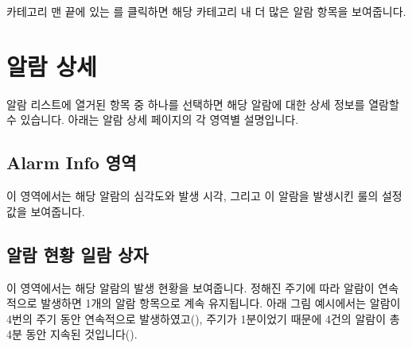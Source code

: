 \documentclass[letterpaper,10pt,english]{sphinxmanual}
\begin{document}
카테고리 맨 끝에 있는 를 클릭하면 해당 카테고리 내 더 많은 알람 항목을 보여줍니다.
\begin{quote}

\begin{figure}[H]
\centering

\noindent{}
\end{figure}
\end{quote}


\section{알람 상세}
\label{\detokenize{part05/index:alarm-details}}\label{\detokenize{part05/index:id3}}
알람 리스트에 열거된 항목 중 하나를 선택하면 해당 알람에 대한 상세 정보를 열람할 수 있습니다. 아래는 알람 상세 페이지의 각 영역별 설명입니다.


\subsection{Alarm Info 영역}
\label{\detokenize{part05/index:alarm-info}}
이 영역에서는 해당 알람의 심각도와 발생 시각, 그리고 이 알람을 발생시킨 룰의 설정값을 보여줍니다.
\begin{quote}

\begin{figure}[H]
\centering

\noindent{}
\end{figure}
\end{quote}


\subsection{알람 현황 일람 상자}
\label{\detokenize{part05/index:id4}}
이 영역에서는 해당 알람의 발생 현황을 보여줍니다. 정해진 주기에 따라 알람이 연속적으로 발생하면 1개의 알람 항목으로 계속 유지됩니다. 아래 그림 예시에서는 알람이 4번의 주기 동안 연속적으로 발생하였고(), 주기가 1분이었기 때문에 4건의 알람이 총 4분 동안 지속된 것입니다().
\begin{quote}

\begin{figure}[H]
\centering

\noindent{}
\end{figure}
\end{quote}
\end{document}
